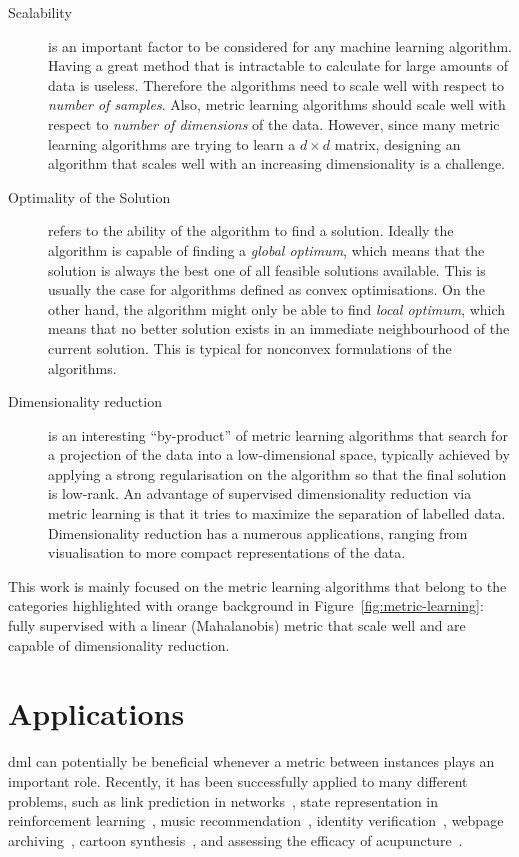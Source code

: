 \documentclass[12pt,a4paper]{report}
\begin{document}
\begin{description}
\item [Scalability] is an important factor to be considered for any machine learning algorithm. Having a great method that is intractable to calculate for large amounts of data is useless. Therefore the algorithms need to scale well with respect to \textit{number of samples}. Also, metric learning algorithms should scale well with respect to \textit{number of dimensions} of the data. However, since many metric learning algorithms are trying to learn a $d \times d$ matrix, designing an algorithm that scales well with an increasing dimensionality is a challenge.

\item [Optimality of the Solution] refers to the ability of the algorithm to find a solution. Ideally the algorithm is capable of finding a \textit{global optimum}, which means that the solution is always the best one of all feasible solutions available. This is usually the case for algorithms defined as convex optimisations. On the other hand, the algorithm might only be able to find \textit{local optimum}, which means that no better solution exists in an immediate neighbourhood of the current solution. This is typical for nonconvex formulations of the algorithms.

\item [Dimensionality reduction] is an interesting ``by-product'' of metric learning algorithms that search for a projection of the data into a low-dimensional space, typically achieved by applying a strong regularisation on the algorithm so that the final solution is low-rank. An advantage of supervised dimensionality reduction via metric learning is that it tries to maximize the separation of labelled data. Dimensionality reduction has a numerous applications, ranging from visualisation to more compact representations of the data.
\end{description}

This work is mainly focused on the metric learning algorithms that belong to the categories highlighted with orange background in Figure~\ref{fig:metric-learning}: fully supervised with a linear (Mahalanobis) metric that scale well and are capable of dimensionality reduction. 

\section{Applications} \label{chap:intro:applications}

\Ac{dml} can potentially be beneficial whenever a metric between instances plays an important role. Recently, it has been successfully applied to many different problems, such as link prediction in networks~\citep{shaw2011learning}, state representation in reinforcement learning~\citep{taylor2011metric}, music recommendation~\citep{mcfee2012learning}, identity verification~\citep{ben2012improved}, webpage archiving~\citep{law2012structural}, cartoon synthesis~\citep{yu2012semisupervised}, and assessing the efficacy of acupuncture~\citep{liang2012learning}.
\end{document}
